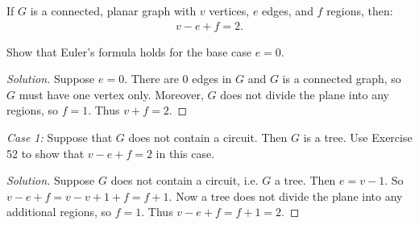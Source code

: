\documentclass[12pt]{article}
\newenvironment{exercise}[2][Exercise]{\begin{trivlist}
        \item[\hskip \labelsep {\bfseries #1}\hskip \labelsep {\bfseries #2.}]}{\end{trivlist}}
\newenvironment{theorem}[2][Theorem]{\begin{trivlist}
        \item[\hskip \labelsep {\bfseries #1}\hskip \labelsep {\bfseries #2.}]}{\end{trivlist}}
\newenvironment{solution}
        {\begin{proof}[Solution]}
                    {\end{proof}}
\begin{document}
\begin{theorem}{7 Euler's Formula}
    If \( G \) is a connected, planar graph with \( v \) vertices, \( e \) edges, and \( f \) regions, then:
    \begin{align*}
        v-e+f = 2.
    \end{align*}
\end{theorem}

\begin{exercise}{54}
    Show that Euler's formula holds for the base case \( e = 0. \)
    \begin{solution}
        Suppose \( e = 0. \) There are 0 edges in \( G \) and \( G \) is a connected graph, so \( G \) must have one vertex only. Moreover, \( G \) does not divide the plane into any regions, so \( f = 1. \) Thus \( v + f = 2. \)
    \end{solution}
\end{exercise}

\begin{exercise}{55}
    \textit{Case 1:} Suppose that \( G \) does not contain a circuit. Then \( G \) is a tree. Use Exercise 52 to show that \( v-e+f = 2 \) in this case.
    \begin{solution}
        Suppose \( G \) does not contain a circuit, i.e. \( G \) a tree. Then \( e = v-1 \). So \( v - e + f = v - v + 1 + f = f + 1. \) Now a tree does not divide the plane into any additional regions, so \( f = 1 . \) Thus \( v -e + f = f + 1 = 2. \)
    \end{solution}
\end{exercise}
\end{document}
